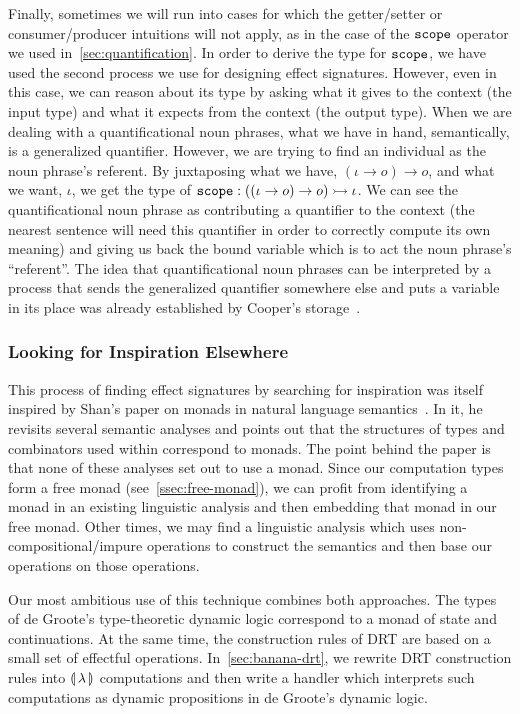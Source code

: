 Finally, sometimes we will run into cases for which the getter/setter or
consumer/producer intuitions will not apply, as in the case of the
$\mathtt{scope}$ operator we used in~\ref{sec:quantification}. In order to
derive the type for $\mathtt{scope}$, we have used the second process we use
for designing effect signatures. However, even in this case, we can reason
about its type by asking what it gives to the context (the input type) and
what it expects from the context (the output type). When we are dealing
with a quantificational noun phrases, what we have in hand, semantically,
is a generalized quantifier. However, we are trying to find an individual
as the noun phrase's referent. By juxtaposing what we have,
$(\iota \to o) \to o$, and what we want, $\iota$, we get the type of
$\mathtt{scope} : ((\iota \to o) \to o) \rightarrowtail \iota$. We can see the
quantificational noun phrase as contributing a quantifier to the context
(the nearest sentence will need this quantifier in order to correctly
compute its own meaning) and giving us back the bound variable which is to
act the noun phrase's ``referent''. The idea that quantificational noun
phrases can be interpreted by a process that sends the generalized
quantifier somewhere else and puts a variable in its place was already
established by Cooper's storage~\cite{cooper1979montague}.


\subsubsection{Looking for Inspiration Elsewhere}

This process of finding effect signatures by searching for inspiration was
itself inspired by Shan's paper on monads in natural language
semantics~\cite{shan2002monads}. In it, he revisits several semantic
analyses and points out that the structures of types and combinators used
within correspond to monads. The point behind the paper is that none of
these analyses set out to use a monad. Since our computation types form a
free monad (see~\ref{ssec:free-monad}), we can profit from identifying a
monad in an existing linguistic analysis and then embedding that monad in
our free monad. Other times, we may find a linguistic analysis which uses
non-compositional/impure operations to construct the semantics and then
base our operations on those operations.

Our most ambitious use of this technique combines both approaches. The
types of de Groote's type-theoretic dynamic logic correspond to a monad of
state and continuations. At the same time, the construction rules of DRT
are based on a small set of effectful operations. In~\ref{sec:banana-drt},
we rewrite DRT construction rules into $\llparenthesis \, \lambda \, \rrparenthesis$ computations and
then write a handler which interprets such computations as dynamic
propositions in de Groote's dynamic logic.

